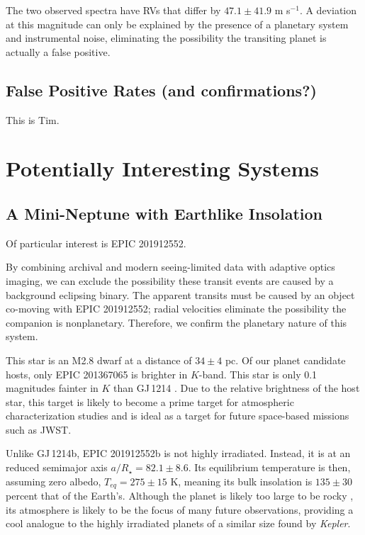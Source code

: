\documentclass{emulateapj}
\newcommand{\ars}{{$a/R_{\star}$}}
\newcommand{\project}[1]{\textsl{#1}}
\newcommand{\kep}{\project{Kepler}}
\begin{document}
The two observed spectra have RVs that differ by $47.1 \pm 41.9$ m s$^{-1}$.
A deviation at this magnitude can only be explained by the presence of
a planetary system and instrumental noise, eliminating the possibility the
transiting planet is actually a false positive.



\subsection{False Positive Rates (and confirmations?)}
This is Tim.

\section{Potentially Interesting Systems}
\subsection{A Mini-Neptune with Earthlike Insolation}

Of particular interest is EPIC 201912552.

By combining archival and modern seeing-limited data with adaptive optics
imaging, we can exclude the possibility these transit events are caused by
a background eclipsing binary.
The apparent transits must be caused by an object co-moving with EPIC 201912552;
radial velocities eliminate the possibility the companion is nonplanetary.
Therefore, we confirm the planetary nature of this system.

This star is an M2.8 dwarf at a distance of $34\pm4$ pc.
Of our planet candidate hosts, only EPIC 201367065 \citep[originally
discovered by][]{Crossfield15} is brighter in $K$-band.
This star is only 0.1 magnitudes fainter in $K$ than GJ\,1214
\citep{Charbonneau09}.
Due to the relative brightness of the host star, this target is likely
to become a prime target for atmospheric characterization studies
and is ideal as a target for future space-based missions such as JWST.

Unlike GJ\,1214b, EPIC 201912552b is not highly irradiated.
Instead, it is at an reduced semimajor axis \ars$ = 82.1 \pm 8.6$.
Its equilibrium temperature is then, assuming zero albedo, $T_{eq} = 275 \pm 15$
K, meaning its bulk insolation is $135 \pm 30$ percent that of the Earth's.
Although the planet is likely too large to be rocky \citep{Rogers14},
its atmosphere is likely to be the focus of many future observations, providing
a cool analogue to the highly irradiated planets of a similar size found by
\kep.
\end{document}
